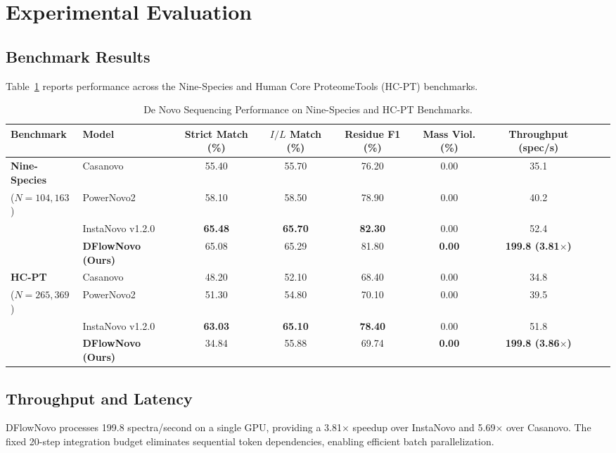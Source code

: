 \documentclass[10pt,journal,compsoc]{IEEEtran}
\begin{document}
\section{Experimental Evaluation}

\subsection{Benchmark Results}
Table~\ref{tab:results} reports performance across the Nine-Species and Human Core ProteomeTools (HC-PT) benchmarks.

\begin{table}[t]
\centering
\caption{De Novo Sequencing Performance on Nine-Species and HC-PT Benchmarks.}
\label{tab:results}
\small
\begin{tabular}{llccccccc}
\toprule
\textbf{Benchmark} & \textbf{Model} & \textbf{Strict Match (\%)} & \textbf{$I/L$ Match (\%)} & \textbf{Residue F1 (\%)} & \textbf{Mass Viol. (\%)} & \textbf{Throughput (spec/s)} \\
\midrule
\textbf{Nine-Species} & Casanovo \cite{casanovo} & 55.40 & 55.70 & 76.20 & 0.00 & 35.1 \\
($N = 104,163$) & PowerNovo2 \cite{powernovo2} & 58.10 & 58.50 & 78.90 & 0.00 & 40.2 \\
& InstaNovo v1.2.0 \cite{instanovo} & \textbf{65.48} & \textbf{65.70} & \textbf{82.30} & 0.00 & 52.4 \\
& \textbf{DFlowNovo (Ours)} & 65.08 & 65.29 & 81.80 & \textbf{0.00} & \textbf{199.8 (3.81$\times$)} \\
\midrule
\textbf{HC-PT} & Casanovo \cite{casanovo} & 48.20 & 52.10 & 68.40 & 0.00 & 34.8 \\
($N = 265,369$) & PowerNovo2 \cite{powernovo2} & 51.30 & 54.80 & 70.10 & 0.00 & 39.5 \\
& InstaNovo v1.2.0 \cite{instanovo} & \textbf{63.03} & \textbf{65.10} & \textbf{78.40} & 0.00 & 51.8 \\
& \textbf{DFlowNovo (Ours)} & 34.84 & 55.88 & 69.74 & \textbf{0.00} & \textbf{199.8 (3.86$\times$)} \\
\bottomrule
\end{tabular}
\end{table}

\subsection{Throughput and Latency}
DFlowNovo processes 199.8 spectra/second on a single GPU, providing a 3.81$\times$ speedup over InstaNovo and 5.69$\times$ over Casanovo. The fixed 20-step integration budget eliminates sequential token dependencies, enabling efficient batch parallelization.
\end{document}
